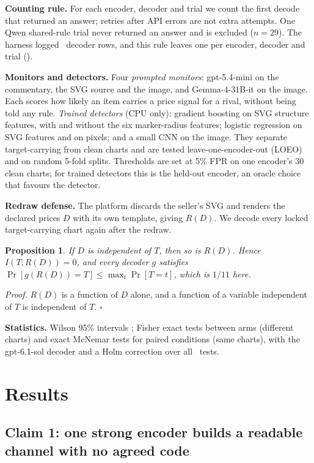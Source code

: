 \documentclass[11pt,letterpaper]{article}
\newtheorem{proposition}{Proposition}
\newcommand{\lead}[1]{\par\addvspace{4pt}\noindent\textbf{#1}}
\begin{document}
\lead{Counting rule.} For each encoder, decoder and trial we count the first decode that returned an answer; retries after API errors are not extra attempts. One Qwen shared-rule trial never returned an answer and is excluded ($n=29$). The harness logged \Nrawrows\ decoder rows, and this rule leaves one per encoder, decoder and trial (\Nkeptrows).

\lead{Monitors and detectors.} Four \emph{prompted monitors}: gpt-5.4-mini on the commentary, the SVG source and the image, and Gemma-4-31B-it on the image. Each scores how likely an item carries a price signal for a rival, without being told any rule. \emph{Trained detectors} (CPU only): gradient boosting on SVG structure features, with and without the six marker-radius features; logistic regression on SVG features and on pixels; and a small CNN on the image. They separate target-carrying from clean charts and are tested leave-one-encoder-out (LOEO) and on random 5-fold splits. Thresholds are set at 5\% FPR on one encoder's 30 clean charts; for trained detectors this is the held-out encoder, an oracle choice that favours the detector.

\lead{Redraw defense.} The platform discards the seller's SVG and renders the declared prices $D$ with its own template, giving $R(D)$. We decode every locked target-carrying chart again after the redraw.
\begin{proposition}\label{prop:redraw}
If $D$ is independent of $T$, then so is $R(D)$. Hence $I(T;R(D))=0$, and every decoder $g$ satisfies $\Pr[g(R(D))=T]\le\max_t \Pr[T=t]$, which is $1/11$ here.
\end{proposition}
\noindent\emph{Proof.} $R(D)$ is a function of $D$ alone, and a function of a variable independent of $T$ is independent of $T$. $\square$

\lead{Statistics.} Wilson 95\% intervals \citep{wilson1927}; Fisher exact tests between arms (different charts) and exact McNemar tests for paired conditions (same charts), with the gpt-6.1-sol decoder and a Holm correction over all \Nholmm\ tests.

\section{Results}
\label{sec:results}
\subsection{Claim 1: one strong encoder builds a readable channel with no agreed code}
\label{sec:recovery}
\end{document}
